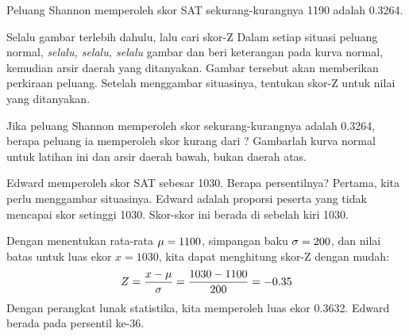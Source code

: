 \begin{examplewrap}
\begin{nexample}
\begin{center}
  \end{center}
  Peluang Shannon memperoleh skor SAT sekurang-kurangnya 1190
  adalah 0.3264.
\end{nexample}
\end{examplewrap}

\begin{onebox}{Selalu gambar terlebih dahulu,
    lalu cari skor-Z}
  Dalam setiap situasi peluang normal,
  \emph{selalu, selalu, selalu} gambar dan beri keterangan pada
  kurva normal, kemudian arsir daerah yang ditanyakan.
  Gambar tersebut akan memberikan perkiraan peluang.
  Setelah menggambar situasinya, tentukan skor-Z untuk nilai
  yang ditanyakan.
\end{onebox}

\begin{exercisewrap}
\begin{nexercise}
Jika peluang Shannon memperoleh skor sekurang-kurangnya \shannonsat{}
adalah 0.3264, berapa peluang ia memperoleh skor kurang dari
\shannonsat{}?
Gambarlah kurva normal untuk latihan ini dan arsir daerah bawah,
bukan daerah atas.\footnotemark{}
\end{nexercise}
\end{exercisewrap}

\D{\newpage}

\newcommand{\edwardsat}{1030}
\newcommand{\edwardsatz}{-0.35}
\newcommand{\edwardsatlower}{0.3632}
\begin{examplewrap}
\begin{nexample}{Edward memperoleh skor SAT sebesar \edwardsat{}.
    Berapa persentilnya?}
  \label{edwardSatBelow\edwardsat{}}%
  Pertama, kita perlu menggambar situasinya.
   Edward adalah proporsi peserta
  yang tidak mencapai skor setinggi \edwardsat{}.
  Skor-skor ini berada di sebelah kiri \edwardsat{}.
\begin{center}
\end{center}
Dengan menentukan rata-rata $\mu=1100{}$, simpangan baku
$\sigma=200{}$, dan nilai batas untuk luas ekor $x=\edwardsat{}$,
kita dapat menghitung skor-Z dengan mudah:
\begin{align*}
Z
  = \frac{x - \mu}{\sigma}
  = \frac{\edwardsat{} - \satmean{}}{\satsd{}}
  = \edwardsatz{}
\end{align*}
Dengan perangkat lunak statistika, kita memperoleh luas ekor 0.3632.
Edward berada pada persentil ke-$36$.
\end{nexample}
\end{examplewrap}


